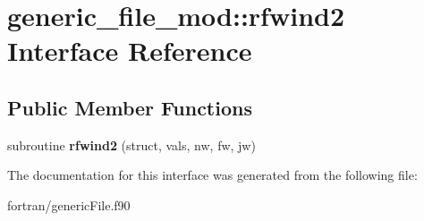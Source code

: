 \hypertarget{interfacegeneric__file__mod_1_1rfwind2}{}\section{generic\+\_\+file\+\_\+mod\+:\+:rfwind2 Interface Reference}
\label{interfacegeneric__file__mod_1_1rfwind2}
\subsection*{Public Member Functions}
\begin{DoxyCompactItemize}
\item 
\mbox{\label{interfacegeneric__file__mod_1_1rfwind2_a972217eea2aa896d7c023d519b9121ea}} 
subroutine {\bfseries rfwind2} (struct, vals, nw, fw, jw)
\end{DoxyCompactItemize}


The documentation for this interface was generated from the following file\+:\begin{DoxyCompactItemize}
\item 
fortran/generic\+File.\+f90\end{DoxyCompactItemize}
